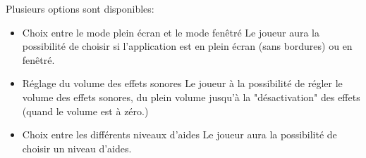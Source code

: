 {
    Plusieurs options sont disponibles:

    \begin{itemize}
        \item {}
        {Choix entre le mode plein écran et le mode fenêtré}
        {
            Le joueur aura la possibilité de choisir si l'application est en plein écran (sans bordures) ou en fenêtré.
        }
    \end{itemize}

    \begin{itemize}
        \item {}
        {Réglage du volume des effets sonores}
        {
            Le joueur à la possibilité de régler le volume des effets sonores, du plein volume jusqu'à la "désactivation" des effets (quand le volume est à zéro.)
        }
    \end{itemize}

    \begin{itemize}
        \item {}
        {Choix entre les différents niveaux d'aides}
        {
            Le joueur aura la possibilité de choisir un niveau d'aides.
        }
    \end{itemize}
}
{

}